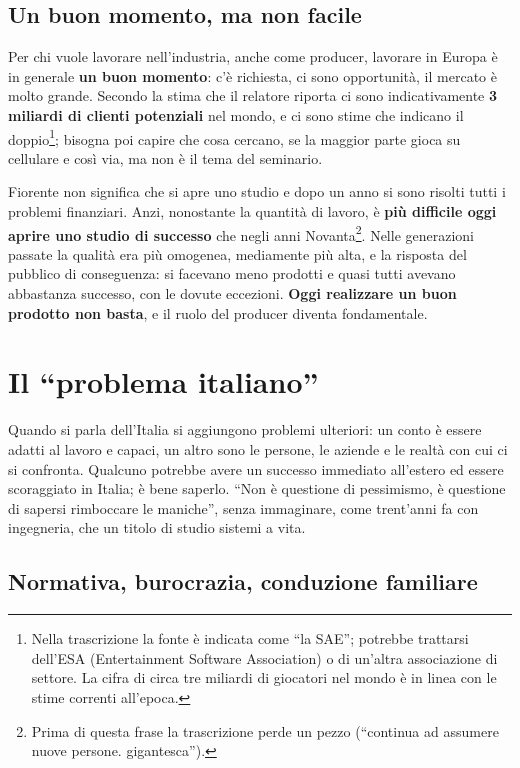 \subsection{Un buon momento, ma non facile}

Per chi vuole lavorare nell'industria, anche come producer, lavorare in Europa è
in generale \textbf{un buon momento}: c'è richiesta, ci sono opportunità, il
mercato è molto grande. Secondo la stima che il relatore riporta ci sono
indicativamente \textbf{3 miliardi di clienti potenziali} nel mondo, e ci sono
stime che indicano il doppio\footnote{Nella trascrizione la fonte è indicata
come ``la SAE''; potrebbe trattarsi dell'ESA (Entertainment Software
Association) o di un'altra associazione di settore. La cifra di circa tre
miliardi di giocatori nel mondo è in linea con le stime correnti all'epoca.};
bisogna poi capire che cosa cercano, se la maggior parte gioca su cellulare e
così via, ma non è il tema del seminario.

Fiorente non significa che si apre uno studio e dopo un anno si sono risolti
tutti i problemi finanziari. Anzi, nonostante la quantità di lavoro, è
\textbf{più difficile oggi aprire uno studio di successo} che negli anni
Novanta\footnote{Prima di questa frase la trascrizione perde un pezzo
(``continua ad assumere nuove persone. gigantesca'').}. Nelle generazioni passate
la qualità era più omogenea, mediamente più alta, e la risposta del pubblico di
conseguenza: si facevano meno prodotti e quasi tutti avevano abbastanza
successo, con le dovute eccezioni. \textbf{Oggi realizzare un buon prodotto non
basta}, e il ruolo del producer diventa fondamentale.

\section{Il ``problema italiano''}
\label{sec:z5-problema-italiano}

Quando si parla dell'Italia si aggiungono problemi ulteriori: un conto è essere
adatti al lavoro e capaci, un altro sono le persone, le aziende e le realtà con
cui ci si confronta. Qualcuno potrebbe avere un successo immediato all'estero ed
essere scoraggiato in Italia; è bene saperlo. ``Non è questione di pessimismo,
è questione di sapersi rimboccare le maniche'', senza immaginare, come
trent'anni fa con ingegneria, che un titolo di studio sistemi a vita.

\subsection{Normativa, burocrazia, conduzione familiare}

